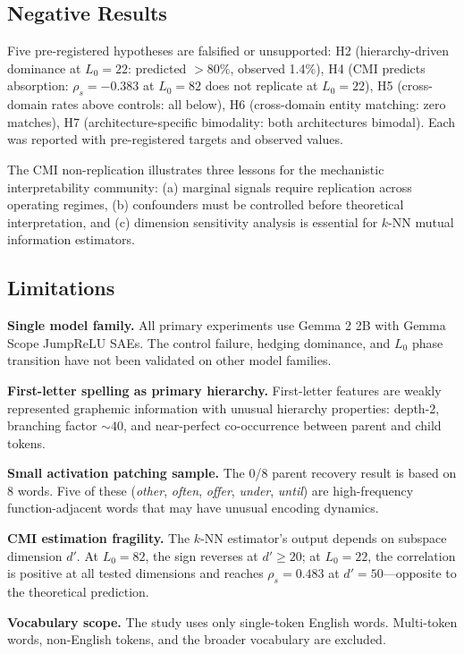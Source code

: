\documentclass{article}
\begin{document}
\subsection{Negative Results}

Five pre-registered hypotheses are falsified or unsupported: H2 (hierarchy-driven dominance at $L_0 = 22$: predicted $> 80\%$, observed 1.4\%), H4 (CMI predicts absorption: $\rho_s = -0.383$ at $L_0 = 82$ does not replicate at $L_0 = 22$), H5 (cross-domain rates above controls: all below), H6 (cross-domain entity matching: zero matches), H7 (architecture-specific bimodality: both architectures bimodal). Each was reported with pre-registered targets and observed values.

The CMI non-replication illustrates three lessons for the mechanistic interpretability community: (a) marginal signals require replication across operating regimes, (b) confounders must be controlled before theoretical interpretation, and (c) dimension sensitivity analysis is essential for $k$-NN mutual information estimators.

\subsection{Limitations}

\textbf{Single model family.} All primary experiments use Gemma 2 2B with Gemma Scope JumpReLU SAEs. The control failure, hedging dominance, and $L_0$ phase transition have not been validated on other model families.

\textbf{First-letter spelling as primary hierarchy.} First-letter features are weakly represented graphemic information with unusual hierarchy properties: depth-2, branching factor ${\sim}40$, and near-perfect co-occurrence between parent and child tokens.

\textbf{Small activation patching sample.} The 0/8 parent recovery result is based on 8 words. Five of these (\emph{other}, \emph{often}, \emph{offer}, \emph{under}, \emph{until}) are high-frequency function-adjacent words that may have unusual encoding dynamics.

\textbf{CMI estimation fragility.} The $k$-NN estimator's output depends on subspace dimension $d'$. At $L_0 = 82$, the sign reverses at $d' \geq 20$; at $L_0 = 22$, the correlation is positive at all tested dimensions and reaches $\rho_s = 0.483$ at $d' = 50$---opposite to the theoretical prediction.

\textbf{Vocabulary scope.} The study uses only single-token English words. Multi-token words, non-English tokens, and the broader vocabulary are excluded.
\end{document}
